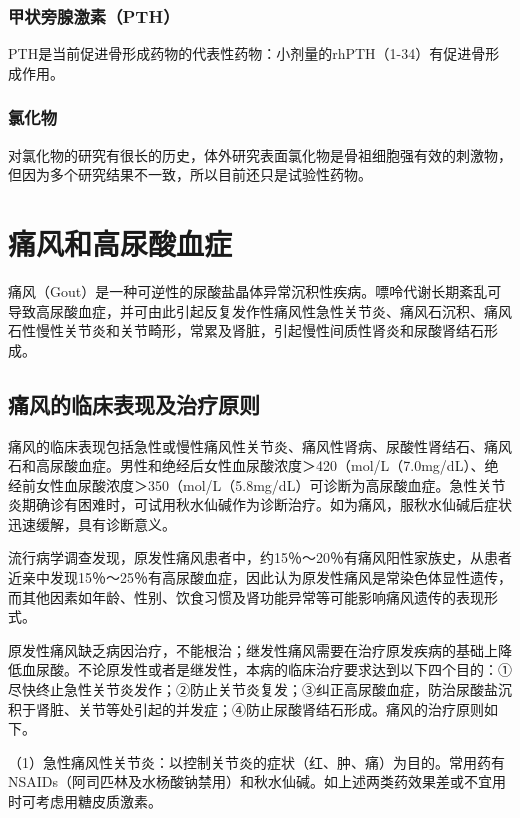 \subsubsection{甲状旁腺激素（PTH）}

PTH是当前促进骨形成药物的代表性药物：小剂量的rhPTH（1-34）有促进骨形成作用。

\subsubsection{氯化物}

对氯化物的研究有很长的历史，体外研究表面氯化物是骨祖细胞强有效的刺激物，但因为多个研究结果不一致，所以目前还只是试验性药物。

\section{痛风和高尿酸血症}

痛风（Gout）是一种可逆性的尿酸盐晶体异常沉积性疾病。嘌呤代谢长期紊乱可导致高尿酸血症，并可由此引起反复发作性痛风性急性关节炎、痛风石沉积、痛风石性慢性关节炎和关节畸形，常累及肾脏，引起慢性间质性肾炎和尿酸肾结石形成。

\subsection{痛风的临床表现及治疗原则}

痛风的临床表现包括急性或慢性痛风性关节炎、痛风性肾病、尿酸性肾结石、痛风石和高尿酸血症。男性和绝经后女性血尿酸浓度＞420（mol/L（7.0mg/dL）、绝经前女性血尿酸浓度＞350（mol/L（5.8mg/dL）可诊断为高尿酸血症。急性关节炎期确诊有困难时，可试用秋水仙碱作为诊断治疗。如为痛风，服秋水仙碱后症状迅速缓解，具有诊断意义。

流行病学调查发现，原发性痛风患者中，约15％～20％有痛风阳性家族史，从患者近亲中发现15％～25％有高尿酸血症，因此认为原发性痛风是常染色体显性遗传，而其他因素如年龄、性别、饮食习惯及肾功能异常等可能影响痛风遗传的表现形式。

原发性痛风缺乏病因治疗，不能根治；继发性痛风需要在治疗原发疾病的基础上降低血尿酸。不论原发性或者是继发性，本病的临床治疗要求达到以下四个目的：①尽快终止急性关节炎发作；②防止关节炎复发；③纠正高尿酸血症，防治尿酸盐沉积于肾脏、关节等处引起的并发症；④防止尿酸肾结石形成。痛风的治疗原则如下。

（1）急性痛风性关节炎：以控制关节炎的症状（红、肿、痛）为目的。常用药有NSAIDs（阿司匹林及水杨酸钠禁用）和秋水仙碱。如上述两类药效果差或不宜用时可考虑用糖皮质激素。

